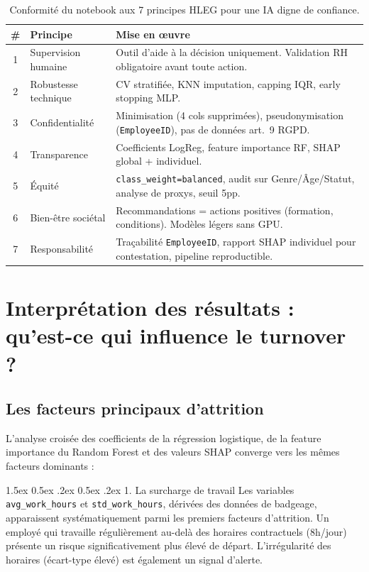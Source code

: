 \documentclass[12pt,a4paper]{article}
\makeatletter
\renewcommand\paragraph{\@startsection{paragraph}{4}{\z@}%
  {1.5ex \@plus 0.5ex \@minus .2ex}%
  {0.5ex \@plus .2ex}%
  {\normalfont\normalsize\bfseries}}
\makeatother
\begin{document}
\begin{table}[ht]
\centering
\small
\begin{tabularx}{\textwidth}{clX}
\toprule
\textbf{\#} & \textbf{Principe} & \textbf{Mise en \oe uvre} \\
\midrule
1 & Supervision humaine & Outil d'aide à la décision uniquement. Validation RH obligatoire avant toute action. \\
2 & Robustesse technique & CV stratifiée, KNN imputation, capping IQR, early stopping MLP. \\
3 & Confidentialité & Minimisation (4 cols supprimées), pseudonymisation (\texttt{EmployeeID}), pas de données art.~9 RGPD. \\
4 & Transparence & Coefficients LogReg, feature importance RF, SHAP global + individuel. \\
5 & Équité & \texttt{class\_weight=balanced}, audit sur Genre/Âge/Statut, analyse de proxys, seuil 5pp. \\
6 & Bien-être sociétal & Recommandations = actions positives (formation, conditions). Modèles légers sans GPU. \\
7 & Responsabilité & Traçabilité \texttt{EmployeeID}, rapport SHAP individuel pour contestation, pipeline reproductible. \\
\bottomrule
\end{tabularx}
\caption{Conformité du notebook aux 7 principes HLEG pour une IA digne de confiance.}
\end{table}

\section{Interprétation des résultats : qu'est-ce qui influence le turnover ?}

\subsection{Les facteurs principaux d'attrition}

L'analyse croisée des coefficients de la régression logistique, de la feature importance du Random Forest et des valeurs SHAP converge vers les mêmes facteurs dominants :

\paragraph{1. La surcharge de travail} Les variables \texttt{avg\_work\_hours} et \texttt{std\_work\_hours}, dérivées des données de badgeage, apparaissent systématiquement parmi les premiers facteurs d'attrition. Un employé qui travaille régulièrement au-delà des horaires contractuels (8h/jour) présente un risque significativement plus élevé de départ. L'irrégularité des horaires (écart-type élevé) est également un signal d'alerte.
\end{document}
